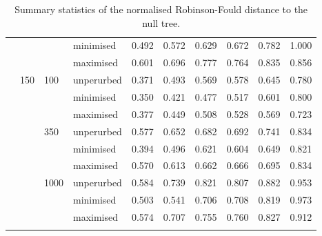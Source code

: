 \begin{longtable}{llllrrrrrr}
   &  &  & minimised & 0.492 & 0.572 & 0.629 & 0.672 & 0.782 & 1.000 \\ 
   &  &  & maximised & 0.601 & 0.696 & 0.777 & 0.764 & 0.835 & 0.856 \\ 
   & 150 & 100 & unperurbed & 0.371 & 0.493 & 0.569 & 0.578 & 0.645 & 0.780 \\ 
   &  &  & minimised & 0.350 & 0.421 & 0.477 & 0.517 & 0.601 & 0.800 \\ 
   &  &  & maximised & 0.377 & 0.449 & 0.508 & 0.528 & 0.569 & 0.723 \\ 
   &  & 350 & unperurbed & 0.577 & 0.652 & 0.682 & 0.692 & 0.741 & 0.834 \\ 
   &  &  & minimised & 0.394 & 0.496 & 0.621 & 0.604 & 0.649 & 0.821 \\ 
   &  &  & maximised & 0.570 & 0.613 & 0.662 & 0.666 & 0.695 & 0.834 \\ 
   &  & 1000 & unperurbed & 0.584 & 0.739 & 0.821 & 0.807 & 0.882 & 0.953 \\ 
   &  &  & minimised & 0.503 & 0.541 & 0.706 & 0.708 & 0.819 & 0.973 \\ 
   &  &  & maximised & 0.574 & 0.707 & 0.755 & 0.760 & 0.827 & 0.912 \\ 
   \hline
\hline
\caption{Summary statistics of the normalised Robinson-Fould distance to the null tree.} 
\label{Full_Tab_SummaryRFnull}
\end{longtable}
